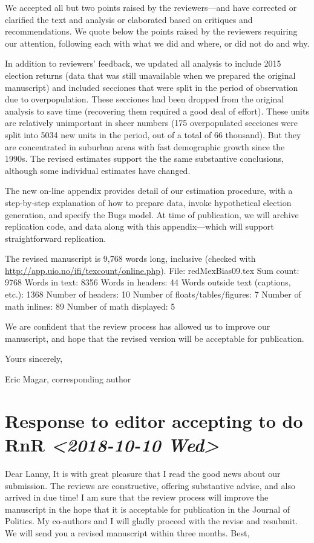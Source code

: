 \documentclass[article,letterpaper,times,12pt,listings-bw,microtype]{article}
\begin{document}
We accepted all but two points raised by the reviewers---and have corrected or clarified the text and analysis or elaborated based on critiques and recommendations. We quote below the points raised by the reviewers requiring our attention, following each with what we did and where, or did not do and why. 

In addition to reviewers' feedback, we updated all analysis to include 2015 election returns (data that was still unavailable when we prepared the original manuscript) and included secciones that were split in the period of observation due to overpopulation. These secciones had been dropped from the original analysis to save time (recovering them required a good deal of effort). These units are relatively unimportant in sheer numbers (175 overpopulated secciones were split into 5034 new units in the period, out of a total of 66 thousand). But they are concentrated in suburban areas with fast demographic growth since the 1990s. The revised estimates support the the same substantive conclusions, although some individual estimates have changed. 

The new on-line appendix provides detail of our estimation procedure, with a step-by-step explanation of how to prepare data, invoke hypothetical election generation, and specify the Bugs model. At time of publication, we will archive replication code, and data along with this appendix---which will support straightforward replication.

The revised manuscript is 9,768 words long, inclusive (checked with \url{http://app.uio.no/ifi/texcount/online.php}). 
File: redMexBias09.tex
Sum count: 9768
Words in text: 8356
Words in headers: 44
Words outside text (captions, etc.): 1368
Number of headers: 10
Number of floats/tables/figures: 7
Number of math inlines: 89
Number of math displayed: 5

We are confident that the review process has allowed us to improve our manuscript, and hope that the revised version will be acceptable for publication.

Yours sincerely,

Eric Magar, corresponding author
\section{Response to editor accepting to do RnR \textit{<2018-10-10 Wed>}}
\label{sec:orge76c59b}
Dear Lanny, 
It is with great pleasure that I read the good news about our submission. The reviews are constructive, offering substantive advise, and also arrived in due time! I am sure that the review process will improve the manuscript in the hope that it is acceptable for publication in the Journal of Politics. My co-authors and I will gladly proceed with the revise and resubmit. We will send you a revised manuscript within three months. 
Best,
\end{document}
